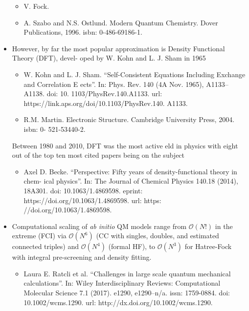 \documentclass[twoside,english]{uiofysmaster}
\begin{document}
\begin{itemize}
\begin{itemize}
		\item V. Fock. %
		\item A. Szabo and N.S. Ostlund. Modern Quantum Chemistry. Dover Publications, 1996. isbn: 0-486-69186-1.
	\end{itemize}
	\item However, by far the most popular approximation is Density Functional Theory (DFT), devel- oped by W. Kohn and L. J. Sham in 1965
	\begin{itemize}
		\item W. Kohn and L. J. Sham. “Self-Consistent Equations Including Exchange and Correlation E ects”. In: Phys. Rev. 140 (4A Nov. 1965), A1133–A1138. doi: 10. 1103/PhysRev.140.A1133. url: https://link.aps.org/doi/10.1103/PhysRev.140. A1133.
		\item R.M. Martin. Electronic Structure. Cambridge University Press, 2004. isbn: 0- 521-53440-2.
	\end{itemize}
	Between 1980 and 2010, DFT was the most active  eld in physics with eight out of the top ten most cited papers being on the subject 
	\begin{itemize}
		\item Axel D. Becke. “Perspective: Fifty years of density-functional theory in chem- ical physics”. In: The Journal of Chemical Physics 140.18 (2014), 18A301. doi: 10.1063/1.4869598. eprint: https://doi.org/10.1063/1.4869598. url: https: //doi.org/10.1063/1.4869598.
	\end{itemize}
	\item Computational scaling of \textit{ab initio} QM models range from $\mathcal{O}(N!)$ in the extreme (FCI) via $\mathcal{O}(N^6)$ (CC with singles, doubles, and estimated connected triples) and $\mathcal{O}(N^4)$ (formal HF), to $\mathcal{O}(N^3)$ for Hatree-Fock with integral pre-screening and density fitting.
	\begin{itemize}
		\item Laura E. Ratcli  et al. “Challenges in large scale quantum mechanical calculations”. In: Wiley Interdisciplinary Reviews: Computational Molecular Science 7.1 (2017). e1290, e1290–n/a. issn: 1759-0884. doi: 10.1002/wcms.1290. url: http://dx.doi.org/10.1002/wcms.1290.
	\end{itemize}
\end{itemize}
\end{document}
